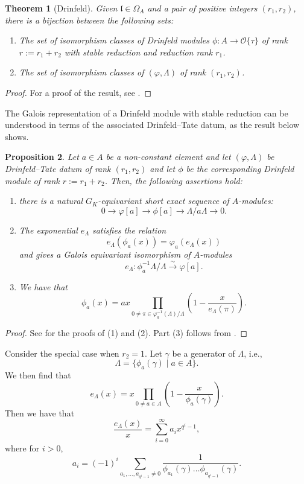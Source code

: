 \documentclass[11pt]{amsart}
\newtheorem{theorem}{Theorem}[section]
\newtheorem{proposition}[theorem]{Proposition}
\newcommand{\cO}{\mathcal{O}}
\numberwithin{equation}{section}
\begin{document}
\begin{theorem}[Drinfeld]\label{DT datum}
Given $\mathfrak{l}\in \Omega_A$ and a pair of positive integers $(r_1, r_2)$, there is a bijection between the following sets:
\begin{enumerate}
\item The set of isomorphism classes of Drinfeld modules $\phi: A\rightarrow \cO\{\tau\}$ of rank $r:=r_1+r_2$ with stable reduction and reduction rank $r_1$.
\item The set of isomorphism classes of $(\varphi,\Lambda)$ of rank $(r_1, r_2)$.
\end{enumerate}
\end{theorem}
\begin{proof}
For a proof of the result, see \cite[Section 6.2]{papibook}.
\end{proof}
The Galois representation of a Drinfeld module with stable reduction can be understood in terms of the associated Drinfeld--Tate datum, as the result below shows.
\begin{proposition}\label{Galois repn propn}
    Let $a\in A$ be a non-constant element and let $(\varphi, \Lambda)$ be Drinfeld--Tate datum of rank $(r_1, r_2)$ and let $\phi$ be the corresponding Drinfeld module of rank $r:=r_1+r_2$. Then, the following assertions hold:
    \begin{enumerate}
        \item there is a natural $G_{K}$-equivariant short exact sequence of $A$-modules:
\[0\longrightarrow \varphi[a]\longrightarrow \phi[a] \rightarrow \Lambda/a\Lambda \longrightarrow 0.\]
\item The exponential $e_\Lambda$ satisfies the relation 
\begin{equation}\label{e lambda equation}e_\Lambda(\phi_a(x))=\varphi_a (e_\Lambda(x))\end{equation}
and gives a Galois equivariant isomorphism of $A$-modules
\[e_\Lambda: \phi_a^{-1}\Lambda/\Lambda\xrightarrow{\sim} \varphi[a].\]
\item We have that
\[\phi_a(x)=ax\prod_{0\neq \pi\in \varphi_a^{-1}(\Lambda)/\Lambda} \left(1-\frac{x}{e_\Lambda(\pi)}\right).\]
    \end{enumerate}
    
\end{proposition}
\begin{proof}
See \cite[pp.355--356]{papibook} for the proofs of (1) and (2). Part (3) follows from \cite[Lemma 5.1.4 and Proposition 6.2.6]{papibook}.
\end{proof}
Consider the special case when $r_2=1$. Let $\gamma$ be a generator of $\Lambda$, i.e., 
\[\Lambda=\{\phi_a(\gamma)\mid a\in A\}.\]We then find that 
\begin{equation}
    e_\Lambda(x)=x\prod_{0\neq a\in A} \left(1-\frac{x}{\phi_a(\gamma)}\right).
\end{equation}
Then we have that 
\[\frac{e_\Lambda(x)}{x}=\sum_{i=0}^\infty a_i x^{q^i-1}, \] where for $i>0$, \begin{equation}\label{equation for a_i}a_i=(-1)^i\sum_{a_1, \dots, a_{q^i-1}\neq 0} \frac{1}{\phi_{a_1}(\gamma)\dots \phi_{a_{q^i-1}}(\gamma)}.\end{equation}
\end{document}
